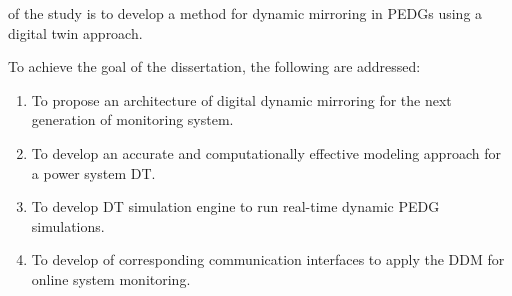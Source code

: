 {\aim} of the study is to develop a method for dynamic mirroring in PEDGs using a digital twin approach. 

To achieve the goal of the dissertation, the following {\tasks} are addressed:
\begin{enumerate}[beginpenalty=10000] %
  \item To propose an architecture of digital dynamic mirroring for the next generation of monitoring system.
  \item To develop an accurate and computationally effective modeling approach for a power system DT.
  \item To develop DT simulation engine to run real-time dynamic PEDG simulations.
  \item To develop of corresponding communication interfaces to apply the DDM for online system monitoring.
\end{enumerate}










